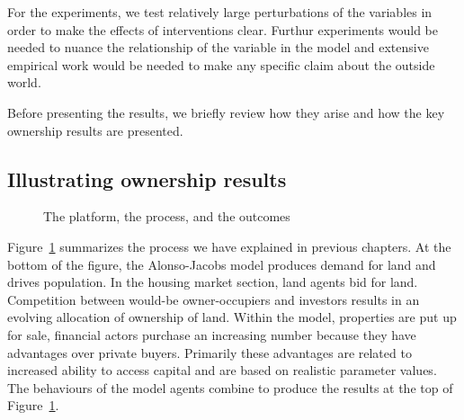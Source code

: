 For the experiments, we test relatively large perturbations of the variables in order to make the effects of interventions clear. Furthur experiments would be needed to nuance the relationship of the variable in the model and extensive empirical work would be needed to make any specific claim about the outside world. 

Before presenting the results, we briefly review how they arise and how the key ownership results are presented.

\subsection*{Illustrating ownership results}

\begin{figure}
\centering
{}
\caption{The platform, the process, and the outcomes}
\label{fig:outcomes}
\end{figure}


 Figure~\ref{fig:outcomes} summarizes the process we have explained in previous chapters. At the bottom of the figure, the \gls{Alonso-Jacobs model} produces demand for land and drives population. In the housing market section, land agents bid for land. Competition between would-be owner-occupiers and investors results in an evolving allocation of ownership of land. Within the model, properties are put up for sale, financial actors purchase an increasing number because they have advantages over private buyers. Primarily these advantages are related to increased ability to access capital and are based on realistic parameter values. The behaviours of the model agents combine to produce the results at the top of Figure~\ref{fig:outcomes}. 


